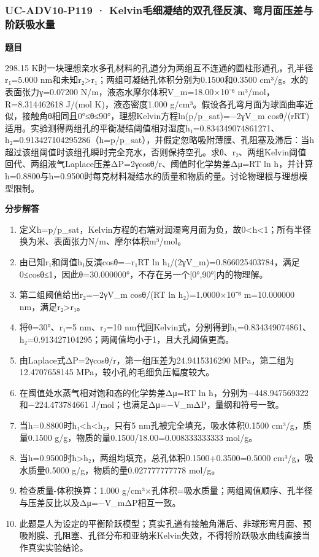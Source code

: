 \documentclass[UTF8,11pt,a4paper]{ctexart}
\begin{document}
\subsubsection*{UC-ADV10-P119 · Kelvin毛细凝结的双孔径反演、弯月面压差与阶跃吸水量}
\noindent\textbf{题目}\par
298.15 K时一块理想亲水多孔材料的孔道分为两组互不连通的圆柱形通孔，孔半径r₁=5.000 nm和未知r₂>r₁；两组可凝结孔体积分别为0.1500和0.3500 cm³/g。水的表面张力γ=0.07200 N/m，液态水摩尔体积V\_m=18.00×10⁻⁶ m³/mol，R=8.314462618 J/(mol K)，液态密度1.000 g/cm³。假设各孔弯月面为球面曲率近似，接触角θ相同且0°≤θ≤90°，理想Kelvin方程ln(p/p\_sat)=−2γV\_m cosθ/(rRT)适用。实验测得两组孔的平衡凝结阈值相对湿度h₁=0.834349074861271、h₂=0.913427104295286（h=p/p\_sat），并假定忽略吸附薄膜、孔阻塞及滞后：当h超过该组阈值时该组孔瞬时完全充水，否则保持空孔。求θ、r₂、两组Kelvin阈值回代、两组液气Laplace压差ΔP=2γcosθ/r、阈值时化学势差Δμ=RT ln h，并计算h=0.8800与h=0.9500时每克材料凝结水的质量和物质的量。讨论物理根与理想模型限制。\par
\medskip\noindent\textbf{分步解答}
\begin{enumerate}
\item 定义h=p/p\_sat，Kelvin方程的右端对润湿弯月面为负，故0<h<1；所有半径换为米、表面张力N/m、摩尔体积m³/mol。
\item 由已知r₁和阈值h₁反演cosθ=−r₁RT ln h₁/(2γV\_m)=0.866025403784，满足0≤cosθ≤1，因此θ=30.000000°，不存在另一个[0°,90°]内的物理解。
\item 第二组阈值给出r₂=−2γV\_m cosθ/(RT ln h₂)=1.0000×10⁻⁸ m=10.000000 nm，满足r₂>r₁。
\item 将θ=30°、r₁=5 nm、r₂=10 nm代回Kelvin式，分别得到h₁=0.834349074861、h₂=0.913427104295；两阈值均小于1，且大孔阈值更高。
\item 由Laplace式ΔP=2γcosθ/r，第一组压差为24.9415316290 MPa，第二组为12.4707658145 MPa，较小孔的毛细负压幅度较大。
\item 在阈值处水蒸气相对饱和态的化学势差Δμ=RT ln h，分别为−448.947569322和−224.473784661 J/mol；也满足Δμ=−V\_mΔP，量纲和符号一致。
\item 当h=0.8800时h₁<h<h₂，只有5 nm孔被完全填充，吸水体积0.1500 cm³/g，质量0.1500 g/g，物质的量0.1500/18.00=0.008333333333 mol/g。
\item 当h=0.9500时h>h₂，两组均填充，总孔体积0.1500+0.3500=0.5000 cm³/g，吸水质量0.5000 g/g，物质的量0.027777777778 mol/g。
\item 检查质量-体积换算：1.000 g/cm³×孔体积=吸水质量；两组阈值顺序、孔半径与压差反比以及Δμ=−V\_mΔP相互一致。
\item 此题是人为设定的平衡阶跃模型；真实孔道有接触角滞后、非球形弯月面、预吸附膜、孔阻塞、孔径分布和亚纳米Kelvin失效，不得将阶跃吸水曲线直接当作真实实验结论。
\end{enumerate}
\end{document}
